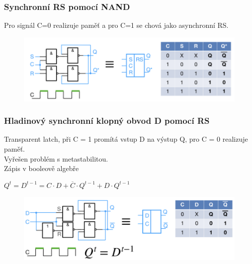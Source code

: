 \subsubsection{Synchronní RS pomocí NAND}
Pro signál C=0 realizuje paměť a pro C=1 se chová jako asynchronní RS.\\
\begin{figure}[h!]
    \centering
    \includegraphics[scale = 0.5]{img/HladRS.png}
\end{figure}

\subsubsection{Hladinový synchronní klopný obvod D pomocí RS}
Transparent latch, při C = 1 promítá vstup D na výstup Q, pro C = 0 realizuje paměť.\\
Vyřešen problém s metastabilitou.\\
\newpage
Zápis v booleově algebře
\begin{center}
    \(Q^t = D^{t-1} = C\cdot D + \overline{C} \cdot Q^{t-1} + D \cdot Q^{t-1}\)
\end{center}

\begin{figure}[h!]
    \centering
    \includegraphics*[width = \textwidth]{img/Dlatch.png}
\end{figure}


